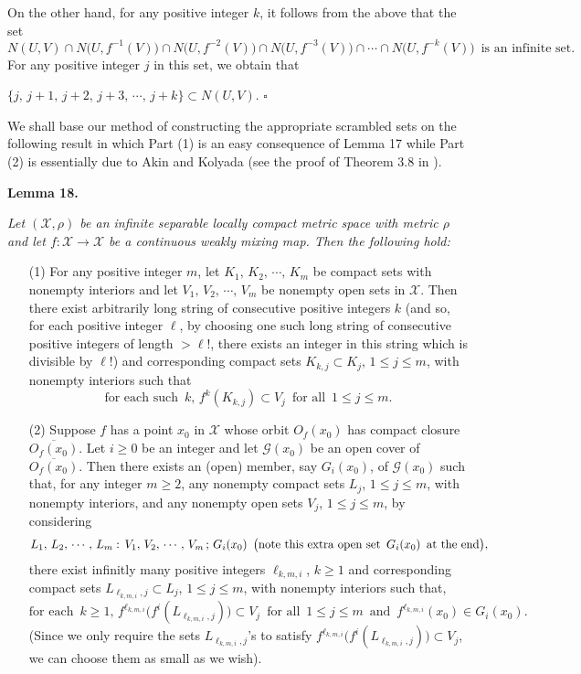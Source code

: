 \documentclass[12pt]{article}
\newcommand{\sq}{$\square$}
\begin{document}
On the other hand, for any positive integer $k$, it follows from the above that the set 
$$N(U, V) \cap N\big(U, f^{-1}(V)\big) \cap N\big(U, f^{-2}(V)\big) \cap N\big(U, f^{-3}(V)\big) \cap \cdots \cap N\big(U, f^{-k}(V)\big) \,\,\, \text{is an infinite set}.
$$
\indent For any positive integer $j$ in this set, we obtain that 

\hspace{1.5in} $\{ j, \, j+1, \, j+2, \, j+3, \, \cdots, \, j+k \} \subset N(U, V)$. 
\hfill\sq

We shall base our method of constructing the appropriate scrambled sets on the following result in which Part (1) is an easy consequence of Lemma 17 while Part (2) is essentially due to Akin and Kolyada (see the proof of Theorem 3.8 in {\bf\cite{akin}}).

\noindent
{\bf Lemma 18.}
{\it Let $(\mathcal X, \rho)$ be an infinite separable locally compact metric space with metric $\rho$ and let $f : \mathcal X \rightarrow \mathcal X$ be a continuous weakly mixing map.  Then the following hold:
\begin{itemize}
\item[{\rm (1)}]
For any positive integer $m$, let  $K_1, \, K_2, \, \cdots, \, K_m$ be compact sets with nonempty interiors and let $V_1, \, V_2, \, \cdots, \, V_m$ be nonempty open sets in $\mathcal X$.  Then there exist arbitrarily long string of {\rm consecutive} positive integers $k$ \big(and so, for each positive integer $\ell$, by choosing one such long string of {\rm consecutive} positive integers of length $> \ell!$, there exists an integer in this string which is divisible by $\ell!$\big) and corresponding compact sets $K_{k,j} \subset K_j$, $1 \le j \le m$, with nonempty interiors such that 
$$
\text{for each such} \,\,\, k, \, f^{k}({K}_{k,j}) \subset V_j \,\,\, \text{for all} \,\,\, 1 \le j \le m.
$$
\item[{\rm (2)}]
Suppose $f$ has a point $x_0$ in $\mathcal X$ whose orbit $O_f(x_0)$ has compact closure $\overline{O_f(x_0)}$.  Let $i \ge 0$ be an integer and let $\mathcal G(x_0)$ be an open cover of $\overline{O_f(x_0)}$.  Then there exists an (open) member, say $G_i(x_0)$, of $\mathcal G(x_0)$ such that, for any integer $m \ge 2$, any nonempty compact sets $L_j$, $1 \le j \le m$, with nonempty interiors, and any nonempty open sets $V_j$, $1 \le j \le m$, by considering 
$$
L_1, \, L_2, \, \cdots, \, L_m: \, V_1, \, V_2, \, \cdots, \, V_m \, ; \, G_i(x_0) \,\,\, \text{\big(note this extra open set} \,\,\, G_i(x_0) \,\,\, \text{at the end}\big),
$$
there exist infinitly many positive integers $\ell_{k,m,i}$, $k \ge 1$ and corresponding compact sets $L_{\ell_{k,m,i},j} \subset L_j$, $1 \le j \le m$, with nonempty interiors such that, 
$$
\text{for each} \,\,\, k \ge 1, \, f^{\ell_{k,m,i}}\big(f^i(L_{\ell_{k,m,i},j})\big) \subset V_j \,\,\, \text{for all} \,\,\, 1 \le j \le m \,\,\, \text{and} \,\,\, f^{\ell_{k,m,i}}(x_0) \in G_i(x_0). 
$$ 
\big(Since we only require the sets $L_{\ell_{k,m,i},j}$'s to satisfy $f^{\ell_{k,m,i}}\big(f^i(L_{\ell_{k,m,i},j})\big) \subset V_j$, we can choose them as small as we wish\big).
\end{itemize}}
\end{document}
